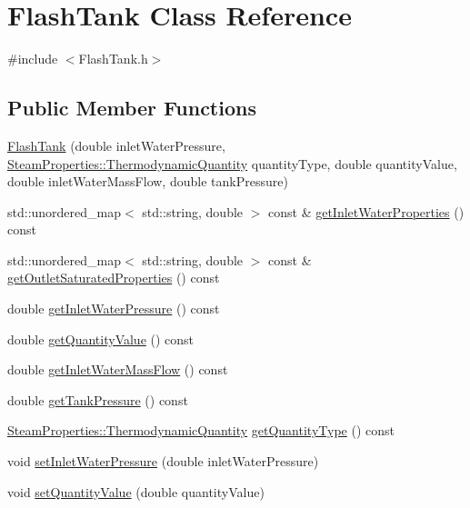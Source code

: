 \hypertarget{class_flash_tank}{}\section{Flash\+Tank Class Reference}
\label{class_flash_tank}


{\ttfamily \#include $<$Flash\+Tank.\+h$>$}

\subsection*{Public Member Functions}
\begin{DoxyCompactItemize}
\item 
\hyperlink{class_flash_tank_ad576e26508da35738127a65fd6ddc35d}{Flash\+Tank} (double inlet\+Water\+Pressure, \hyperlink{class_steam_properties_ae0294bedf7d178c2d8fb6aed0f62fbff}{Steam\+Properties\+::\+Thermodynamic\+Quantity} quantity\+Type, double quantity\+Value, double inlet\+Water\+Mass\+Flow, double tank\+Pressure)
\item 
std\+::unordered\+\_\+map$<$ std\+::string, double $>$ const  \& \hyperlink{class_flash_tank_a57a316e4ef448f4a9447b675ba6ac84b}{get\+Inlet\+Water\+Properties} () const
\item 
std\+::unordered\+\_\+map$<$ std\+::string, double $>$ const  \& \hyperlink{class_flash_tank_aa22fdef56a1ad6d70beda66cc8a6940a}{get\+Outlet\+Saturated\+Properties} () const
\item 
double \hyperlink{class_flash_tank_a62e8ff97d91da0845526c494022e41da}{get\+Inlet\+Water\+Pressure} () const
\item 
double \hyperlink{class_flash_tank_ab2145598969881df58736a1b65326d17}{get\+Quantity\+Value} () const
\item 
double \hyperlink{class_flash_tank_a2b6dcd9e175a9f2fc550ea91006aa66a}{get\+Inlet\+Water\+Mass\+Flow} () const
\item 
double \hyperlink{class_flash_tank_af5d4f0bf7babe61120e1e4452594e1af}{get\+Tank\+Pressure} () const
\item 
\hyperlink{class_steam_properties_ae0294bedf7d178c2d8fb6aed0f62fbff}{Steam\+Properties\+::\+Thermodynamic\+Quantity} \hyperlink{class_flash_tank_a1800317a9b9dd8ff8fb18c693e846a45}{get\+Quantity\+Type} () const
\item 
void \hyperlink{class_flash_tank_aed0991a7902401d110fb2f4b472326f5}{set\+Inlet\+Water\+Pressure} (double inlet\+Water\+Pressure)
\item 
void \hyperlink{class_flash_tank_ac7392743aeaf8de6ce368814ea42e236}{set\+Quantity\+Value} (double quantity\+Value)

\end{DoxyCompactItemize}
